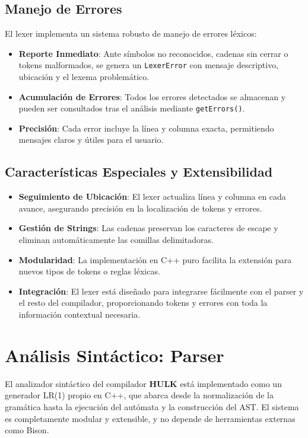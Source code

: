 \documentclass[11pt, a4paper, twoside]{article} %
\begin{document}
\subsection{Manejo de Errores}

El lexer implementa un sistema robusto de manejo de errores léxicos:
\begin{itemize}
    \item \textbf{Reporte Inmediato}: Ante símbolos no reconocidos, cadenas sin cerrar o tokens malformados, se genera un \texttt{LexerError} con mensaje descriptivo, ubicación y el lexema problemático.
    \item \textbf{Acumulación de Errores}: Todos los errores detectados se almacenan y pueden ser consultados tras el análisis mediante \texttt{getErrors()}.
    \item \textbf{Precisión}: Cada error incluye la línea y columna exacta, permitiendo mensajes claros y útiles para el usuario.
\end{itemize}

\subsection{Características Especiales y Extensibilidad}

\begin{itemize}
    \item \textbf{Seguimiento de Ubicación}: El lexer actualiza línea y columna en cada avance, asegurando precisión en la localización de tokens y errores.
    \item \textbf{Gestión de Strings}: Las cadenas preservan los caracteres de escape y eliminan automáticamente las comillas delimitadoras.
    \item \textbf{Modularidad}: La implementación en C++ puro facilita la extensión para nuevos tipos de tokens o reglas léxicas.
    \item \textbf{Integración}: El lexer está diseñado para integrarse fácilmente con el parser y el resto del compilador, proporcionando tokens y errores con toda la información contextual necesaria.
\end{itemize}

\section{An\'alisis Sint\'actico: Parser}

El analizador sintáctico del compilador \textbf{HULK} está implementado como un generador LR(1) propio en C++, que abarca desde la normalización de la gramática hasta la ejecución del autómata y la construcción del AST. El sistema es completamente modular y extensible, y no depende de herramientas externas como Bison.
\end{document}
